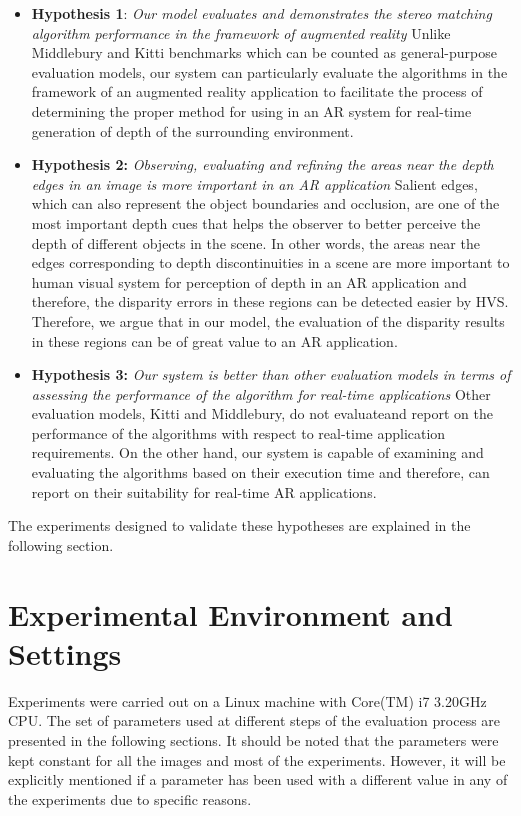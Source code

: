 \begin{itemize}
\item \textbf{Hypothesis 1}: \emph{Our model evaluates and demonstrates the stereo matching algorithm performance in the framework of augmented reality} 
Unlike Middlebury and Kitti benchmarks which can be counted as general-purpose evaluation models, our system can particularly evaluate the algorithms in the framework of an 
augmented reality application to facilitate the process of determining
the proper method for using in an AR system for real-time generation of depth of the surrounding environment.

\item \textbf{Hypothesis 2:} \emph{Observing, evaluating and refining the areas near the depth edges in an image is more important in an AR application}
Salient edges, which can also represent the object boundaries and occlusion, are one of the 
most important depth cues that helps the observer to better perceive the depth of different objects in the scene. In other words, the areas near the edges corresponding to depth discontinuities
in a scene are more important to human visual system for perception of depth in an AR application and therefore, the disparity 
errors in these regions can be detected easier by HVS. Therefore, we argue that in our model, the evaluation of the disparity results in these regions can be of great value 
to an AR application.

\item \textbf{Hypothesis 3:} \emph{Our system is better than other evaluation models in terms of assessing the performance of the algorithm for real-time applications}  
Other evaluation models, Kitti and Middlebury, do not evaluateand report on the performance of the algorithms
with respect to real-time application requirements. On the other hand, our system is capable of examining and evaluating the algorithms 
based on their execution time and therefore, can report on
their suitability for real-time AR applications.

\end{itemize}

The experiments designed to validate these hypotheses are explained in the following section.

\section{Experimental Environment and Settings}
Experiments were carried out on a Linux machine with Core(TM) i7 3.20GHz CPU. 
The set of parameters used at different steps of the evaluation process are presented in the following sections.
It should be noted that the parameters were kept constant for all the images and most of the experiments. 
However, it will be explicitly mentioned if a parameter has been used with a different value in any of the experiments due to specific reasons.


